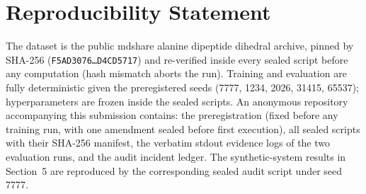 \section*{Reproducibility Statement}
The dataset is the public mdshare alanine dipeptide dihedral archive, pinned
by SHA-256
(\texttt{F5AD3076\ldots D4CD5717}) and re-verified inside every sealed
script before any computation (hash mismatch aborts the run). Training and
evaluation are fully deterministic given the preregistered seeds
(7777, 1234, 2026, 31415, 65537); hyperparameters are frozen inside the
sealed scripts. An anonymous repository accompanying this submission
contains: the preregistration (fixed before any training run, with one
amendment sealed before first execution), all sealed scripts with their
SHA-256 manifest, the verbatim stdout evidence logs of the two evaluation
runs, and the audit incident ledger. The synthetic-system results in
Section~5 are reproduced by the corresponding sealed audit script under
seed 7777.
